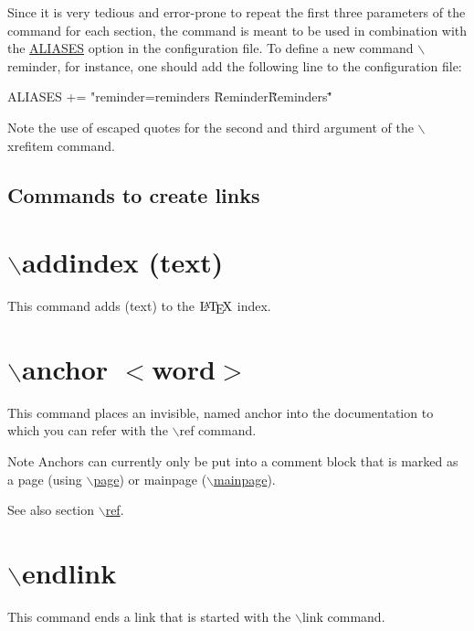 Since it is very tedious and error-\/prone to repeat the first three parameters of the command for each section, the command is meant to be used in combination with the \hyperlink{config_cfg_aliases}{ALIASES} option in the configuration file. To define a new command $\backslash$reminder, for instance, one should add the following line to the configuration file: \begin{DoxyVerb}ALIASES += "reminder=\xrefitem reminders \"Reminder\" \"Reminders\"" \end{DoxyVerb}
 Note the use of escaped quotes for the second and third argument of the $\backslash$xrefitem command.





 \subsection*{ Commands to create links  }

\hypertarget{commands_cmdaddindex}{}\section{$\backslash$addindex (text)}\label{commands_cmdaddindex}
 This command adds (text) to the $\mbox{\LaTeX}$ index.



 \hypertarget{commands_cmdanchor}{}\section{$\backslash$anchor $<$word$>$}\label{commands_cmdanchor}
 This command places an invisible, named anchor into the documentation to which you can refer with the $\backslash$ref command.

\begin{DoxyNote}{Note}
Anchors can currently only be put into a comment block that is marked as a page (using \hyperlink{commands_cmdpage}{$\backslash$page}) or mainpage (\hyperlink{commands_cmdmainpage}{$\backslash$mainpage}).
\end{DoxyNote}
\begin{DoxySeeAlso}{See also}
section \hyperlink{commands_cmdref}{$\backslash$ref}.
\end{DoxySeeAlso}


 \hypertarget{commands_cmdendlink}{}\section{$\backslash$endlink}\label{commands_cmdendlink}
 This command ends a link that is started with the $\backslash$link command.

